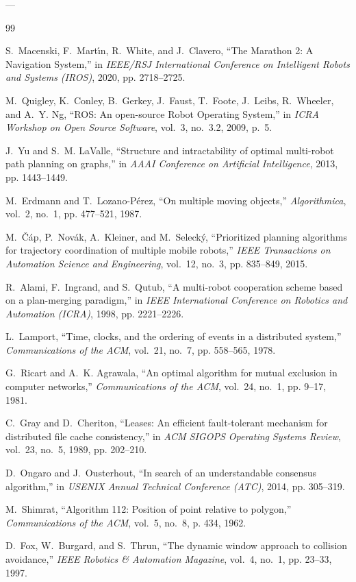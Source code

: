 \documentclass[10pt,twocolumn,a4paper]{article}
\theoremstyle{definition}
\begin{document}
---

\begin{thebibliography}{99}

S.~Macenski, F.~Mart{\'\i}n, R.~White, and J.~Clavero, ``The Marathon 2: A Navigation System,'' in \emph{IEEE/RSJ International Conference on Intelligent Robots and Systems (IROS)}, 2020, pp. 2718--2725.

M.~Quigley, K.~Conley, B.~Gerkey, J.~Faust, T.~Foote, J.~Leibs, R.~Wheeler, and A.~Y. Ng, ``ROS: An open-source Robot Operating System,'' in \emph{ICRA Workshop on Open Source Software}, vol.~3, no.~3.2, 2009, p.~5.

J.~Yu and S.~M. LaValle, ``Structure and intractability of optimal multi-robot path planning on graphs,'' in \emph{AAAI Conference on Artificial Intelligence}, 2013, pp. 1443--1449.

M.~Erdmann and T.~Lozano-P{\'e}rez, ``On multiple moving objects,'' \emph{Algorithmica}, vol.~2, no.~1, pp. 477--521, 1987.

M.~{\v{C}}{\'a}p, P.~Nov{\'a}k, A.~Kleiner, and M.~Seleck{\'y}, ``Prioritized planning algorithms for trajectory coordination of multiple mobile robots,'' \emph{IEEE Transactions on Automation Science and Engineering}, vol.~12, no.~3, pp. 835--849, 2015.

R.~Alami, F.~Ingrand, and S.~Qutub, ``A multi-robot cooperation scheme based on a plan-merging paradigm,'' in \emph{IEEE International Conference on Robotics and Automation (ICRA)}, 1998, pp. 2221--2226.

L.~Lamport, ``Time, clocks, and the ordering of events in a distributed system,'' \emph{Communications of the ACM}, vol.~21, no.~7, pp. 558--565, 1978.

G.~Ricart and A.~K. Agrawala, ``An optimal algorithm for mutual exclusion in computer networks,'' \emph{Communications of the ACM}, vol.~24, no.~1, pp. 9--17, 1981.

C.~Gray and D.~Cheriton, ``Leases: An efficient fault-tolerant mechanism for distributed file cache consistency,'' in \emph{ACM SIGOPS Operating Systems Review}, vol.~23, no.~5, 1989, pp. 202--210.

D.~Ongaro and J.~Ousterhout, ``In search of an understandable consensus algorithm,'' in \emph{USENIX Annual Technical Conference (ATC)}, 2014, pp. 305--319.

M.~Shimrat, ``Algorithm 112: Position of point relative to polygon,'' \emph{Communications of the ACM}, vol.~5, no.~8, p. 434, 1962.

D.~Fox, W.~Burgard, and S.~Thrun, ``The dynamic window approach to collision avoidance,'' \emph{IEEE Robotics \& Automation Magazine}, vol.~4, no.~1, pp. 23--33, 1997.

\end{thebibliography}
\end{document}
